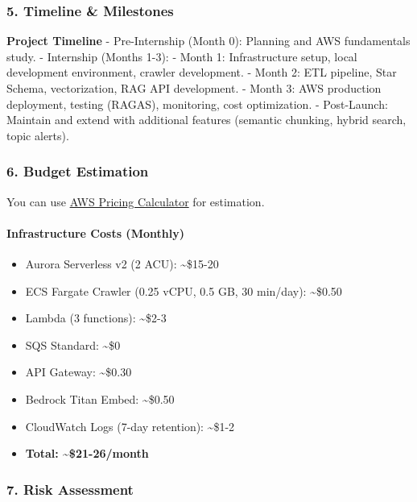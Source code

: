 \hypertarget{timeline-milestones}{%
\subsubsection{5. Timeline \& Milestones}}

\textbf{Project Timeline} - Pre-Internship (Month 0): Planning and AWS
fundamentals study. - Internship (Months 1-3): - Month 1: Infrastructure
setup, local development environment, crawler development. - Month 2:
ETL pipeline, Star Schema, vectorization, RAG API development. - Month
3: AWS production deployment, testing (RAGAS), monitoring, cost
optimization. - Post-Launch: Maintain and extend with additional
features (semantic chunking, hybrid search, topic alerts).

\hypertarget{budget-estimation}{%
\subsubsection{6. Budget Estimation}}

You can use \href{https://calculator.aws/\#/}{AWS Pricing Calculator}
for estimation.

\hypertarget{infrastructure-costs-monthly}{%
\paragraph{Infrastructure Costs
(Monthly)}}

\begin{itemize}
\tightlist
\item
  Aurora Serverless v2 (2 ACU): \textasciitilde\$15-20
\item
  ECS Fargate Crawler (0.25 vCPU, 0.5 GB, 30 min/day):
  \textasciitilde\$0.50
\item
  Lambda (3 functions): \textasciitilde\$2-3
\item
  SQS Standard: \textasciitilde\$0
\item
  API Gateway: \textasciitilde\$0.30
\item
  Bedrock Titan Embed: \textasciitilde\$0.50
\item
  CloudWatch Logs (7-day retention): \textasciitilde\$1-2
\item
  \textbf{Total: \textasciitilde\$21-26/month}
\end{itemize}

\hypertarget{risk-assessment}{%
\subsubsection{7. Risk Assessment}}


